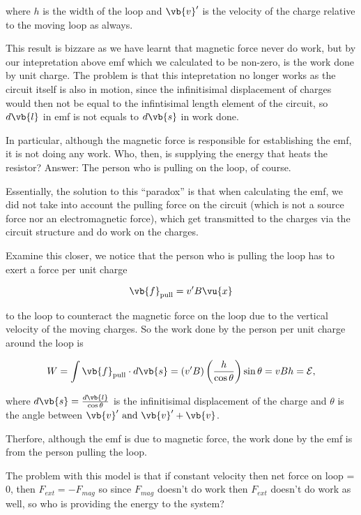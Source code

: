 \documentclass[english,a4paper,12pt]{report}
\begin{document}
where \(h\) is the width of the loop and \(\vb{v} '\) is the velocity of the charge relative to the moving loop as always.

This result is bizzare as we have learnt that magnetic force never do work, but by our intepretation above emf which we calculated to be non-zero, is the work done by unit charge. The problem is that this intepretation no longer works as the circuit itself is also in motion, since the infinitisimal displacement of charges would then not be equal to the infintisimal length element of the circuit, so \(d \vb{l} \)  in emf is not equals to \(d \vb{s} \)  in work done.

In particular, although the magnetic force is responsible for establishing the emf, it is not doing any work. Who, then, is supplying the energy that heats the resistor? Answer: The person who is pulling on the loop, of course.

Essentially, the solution to this “paradox” is that when calculating the emf, we did not take into account the pulling force on the circuit (which is not a source force nor an electromagnetic force), which get transmitted to the charges via the circuit structure and do work on the charges.

Examine this closer, we notice that the person who is pulling the loop has to exert a force per unit charge 

\begin{equation}
    \vb{f} _{\text{pull} } = v' B \vu{x}  
\end{equation}

to the loop to counteract the magnetic force on the loop due to the vertical velocity of the moving charges. So the work done by the person per unit charge around the loop is 

\begin{equation}
    W = \int \vb{f} _{\text{pull} } \cdot  d \vb{s} =  (v'B) \left( \frac{h}{\cos \theta }   \right) \sin \theta = vBh = \mathcal{E} ,
\end{equation}

where \(d \vb{s} = \frac{d \vb{l} }{\cos \theta } \) is the infinitisimal displacement of the charge and \(\theta \) is the angle between \(\vb{v} ' \text { and } \vb{v} '+\vb{v} \). 

Therfore, although the emf is due to magnetic force, the work done by the emf is from the person pulling the loop.

The problem with this model is that if constant velocity then net force on loop = 0, then \(F_{ext} = - F_{mag} \) so since \(F_{mag} \) doesn't do work then \(F_{ext} \) doesn't do work as well, so who is providing the energy to the system?    
\end{document}
